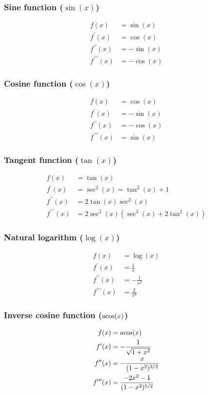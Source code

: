 \documentclass[english]{../thermomemo/thermomemo}
\begin{document}
\subsubsection{Sine function ($\sin(x)$)}
\begin{align}
  f(x) &= \sin(x) \\
  f^\prime(x) &= \cos(x) \\
  f^{\prime\prime}(x) &= -\sin(x) \\
  f^{\prime\prime\prime}(x) &= -\cos(x)
\end{align}
\subsubsection{Cosine function ($\cos(x)$)}
\begin{align}
  f(x) &= \cos(x) \\
  f^\prime(x) &= -\sin(x) \\
  f^{\prime\prime}(x) &= -\cos(x) \\
  f^{\prime\prime\prime}(x) &= \sin(x)
\end{align}
\subsubsection{Tangent function ($\tan(x)$)}
\begin{align}
  f(x) &= \tan(x) \\
  f^\prime(x) &= \sec^2 (x) = \tan^2(x) + 1 \\
  f^{\prime\prime}(x) &= 2 \tan(x) \sec^2(x)  \\
  f^{\prime\prime\prime}(x) &= 2 \sec^2(x) (\sec^2(x) + 2 \tan^2(x))
\end{align}
\subsubsection{Natural logarithm ($\log(x)$)}
\begin{align}
  f(x) &= \log(x) \\
  f^\prime(x) &= \frac{1}{x} \\
  f^{\prime\prime}(x) &= -\frac{1}{x^2}\\
  f^{\prime\prime\prime}(x) &= \frac{2}{x^3}
\end{align}
\subsubsection{Inverse cosine function ($\acos(x)$)}
\begin{align}
  f(x) &= \acos(x) \\
  f^\prime(x) &= -\frac{1}{\sqrt{1 + x^2}} \\
  f^{\prime\prime}(x) &= -\frac{x}{(1 - x^2)^{3/2}}\\
  f^{\prime\prime\prime}(x) &= \frac{-2 x^2 - 1}{(1 - x^2)^{5/2}}
\end{align}
\end{document}
